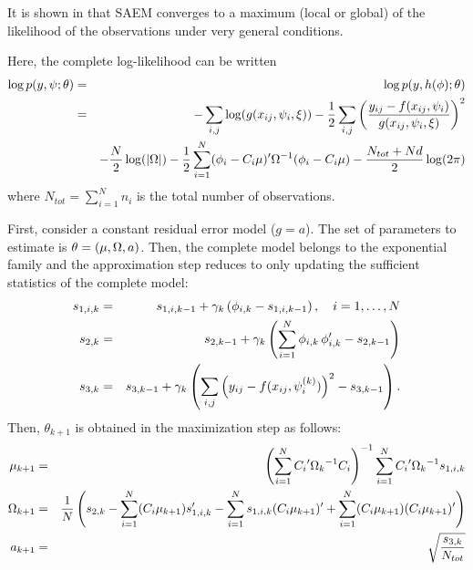 It is shown in \cite{Delyon} that SAEM converges to a maximum (local or global) of the likelihood of the observations under very general conditions.

Here, the complete log-likelihood can be written
\begin{eqnarray*}
\log p(\yg,\psig;\theta) & = &  \log p(\yg,h(\phig);\theta) \\
&=& - \sum_{i,j}\log( g(x_{ij},\psigi,\xi) )
-\frac{1}{2} \sum_{i,j}\left( \frac{y_{ij} - f(x_{ij},\psigi)}{g(x_{ij},\psigi,\xi) } \right)^2 \\
& & -\frac{N}{2} \log (|\IIV|) -\frac{1}{2}\sum_{i=1}^{N}(\phigi-\magi\fixed_effect)^\prime \IIV^{-1}(\phigi-\magi\fixed_effect)
 -\frac{ N_{tot}+Nd}{2}\log(2\pi)
\end{eqnarray*}
where $N_{tot}=\sum_{i=1}^{N}n_i$ is the total number of observations.

First, consider a constant residual error model ($g=a$). The set of parameters to estimate is $\theta=(\fixed_effect, \IIV, \ag)$. Then, the complete model belongs to the exponential family and the approximation step reduces to only updating the sufficient statistics of the complete model:
\begin{eqnarray*}
s_{1,i,k} &= & s_{1,i,k-1}  + \gamma_k \left(  {\phi}_{i,k} - s_{1,i,k-1}   \right) , \hspace{1em}i=1,\ldots,N \\
 s_{2,k} &= & s_{2,k-1}  + \gamma_k \left( \sum_{i=1}^{N} {\phi}_{i,k} \, {\phi}_{i,k}^\prime - s_{2,k-1}   \right)  \\
 s_{3,k} &= & s_{3,k-1}  + \gamma_k \left( \sum_{i,j} \left( y_{ij} - f(x_{ij},{\psi_i^{(k)}}) \right) ^2      - s_{3,k-1} \right) .
\end{eqnarray*}
Then, $\theta_{k+1}$ is obtained in the maximization step as follows:
 \begin{eqnarray}
\mugkun &= &\left( \sum_{i=1}^{N}  \magi^\prime \IIVk ^{-1} \magi\right)^{-1} \sum_{i=1}^N \magi^\prime \IIVk ^{-1} s_{1,i,k}  \\
\IIVkun &=& \frac{1}{N} \left(s_{2,k}- \sum_{i=1}^N(\magi\mugkun)s_{1,i,k}^\prime -\sum_{i=1}^N s_{1,i,k}(\magi\mugkun)^\prime +\sum_{i=1}^N (\magi\mugkun)(\magi\mugkun)^\prime\right) \label{react_gamma} \\
\ag_{k+1} & = & \sqrt{ \frac{s_{3,k}}{N_{tot}} }
\end{eqnarray}


